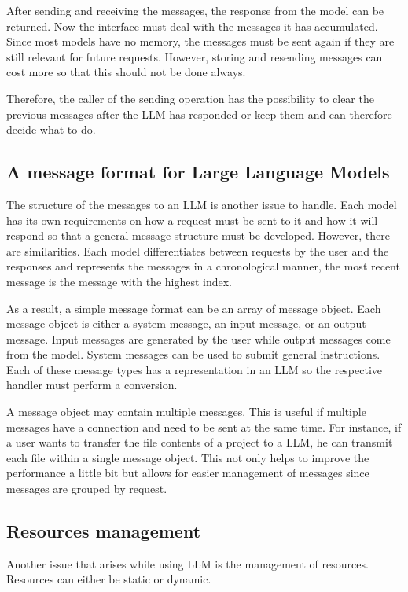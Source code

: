 After sending and receiving the messages, the response from the model can be returned. Now the interface must deal with the messages it has accumulated. Since most models have no memory, the messages must be sent again if they are still relevant for future requests. However, storing and resending messages can cost more so that this should not be done always.

Therefore, the caller of the sending operation has the possibility to clear the previous messages after the \ac{LLM} has responded or keep them and can therefore decide what to do.

\subsection{A message format for Large Language Models} \label{sec:llm_msg_structure}
The structure of the messages to an \ac{LLM} is another issue to handle. Each model has its own requirements on how a request must be sent to it and how it will respond so that a general message structure must be developed. However, there are similarities. Each model differentiates between requests by the user and the responses and represents the messages in a chronological manner, the most recent message is the message with the highest index. 

As a result, a simple message format can be an array of message object. Each message object is either a system message, an input message, or an output message. Input messages are generated by the user while output messages come from the model. System messages can be used to submit general instructions.  Each of these message types has a representation in an \ac{LLM} so the respective handler must perform a conversion. 

A message object may contain multiple messages. This is useful if multiple messages have a connection and need to be sent at the same time. For instance, if a user wants to transfer the file contents of a project to a \ac{LLM}, he can transmit each file within a single message object. This not only helps to improve the performance a little bit but allows for easier management of messages since messages are grouped by request. 

\subsection{Resources management}\label{llm_msg_storage}

Another issue that arises while using \ac{LLM} is the management of resources. Resources can either be static or dynamic. 

